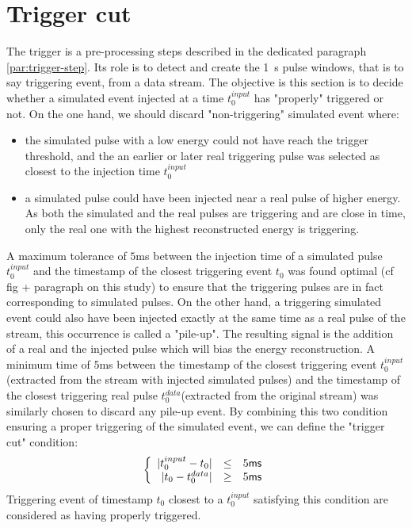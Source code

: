 \section{Trigger cut}
\label{par:trigger-cut}

The trigger is a pre-processing steps described in the dedicated paragraph \ref{par:trigger-step}. Its role is to detect and create the \SI{1}{\s} pulse windows, that is to say triggering event, from a data stream. The objective is this section is to decide whether a simulated event injected at a time $t_0^{input}$ has "properly" triggered or not.
On the one hand, we should discard "non-triggering" simulated event where:
\begin{itemize}
	\item the simulated pulse with a low energy could not have reach the trigger threshold, and the an earlier or later real triggering pulse was selected as closest to the injection time $t_0^{input}$
	\item a simulated pulse could have been injected near a real pulse of higher energy. As both the simulated and the real pulses are triggering and are close in time, only the real one with the highest reconstructed energy is triggering.
\end{itemize}
A maximum tolerance of $5$ms between the injection time of a simulated pulse $t_0^{input}$ and the timestamp of the closest triggering event $t_0$ was found optimal {\color{red}(cf fig + paragraph on this study)} to ensure that the triggering pulses are in fact corresponding to simulated pulses.
On the other hand, a triggering simulated event could also have been injected exactly at the same time as a real pulse of the stream, this occurrence is called a "pile-up". The resulting signal is the addition of a real and the injected pulse which will bias the energy reconstruction. A minimum time of $5$ms between the timestamp of the closest triggering event $t_0^{input}$(extracted from the stream with injected simulated pulses) and the timestamp of the closest triggering real pulse $t_0^{data}$(extracted from the original stream) was similarly chosen to discard any pile-up event.
By combining this two condition ensuring a proper triggering of the simulated event, we can define the "trigger cut" condition:
\begin{equation}
\left\{
\begin{array}{r c l}
| t_0^{input} - t_0 | &\leq& 5\textsf{ms}\\
| t_0 - t_0^{data} | &\geq& 5\textsf{ms}
\end{array}
\right.
\end{equation}
Triggering event of timestamp $t_0$ closest to a $t_0^{input}$ satisfying this condition are considered as having properly triggered.

